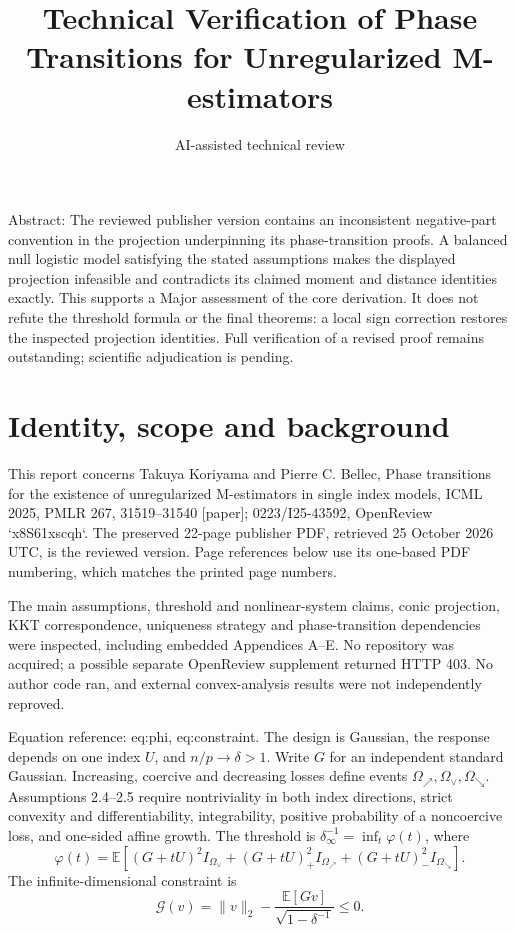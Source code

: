 \documentclass[10pt]{article}
\title{Technical Verification of Phase Transitions for Unregularized M-estimators}
\author{AI-assisted technical review}
\date{}
\begin{document}
\maketitle
Abstract: The reviewed publisher version contains an inconsistent negative-part convention in the projection underpinning its phase-transition proofs. A balanced null logistic model satisfying the stated assumptions makes the displayed projection infeasible and contradicts its claimed moment and distance identities exactly. This supports a Major assessment of the core derivation. It does not refute the threshold formula or the final theorems: a local sign correction restores the inspected projection identities. Full verification of a revised proof remains outstanding; scientific adjudication is pending.\par
\section*{Identity, scope and background}
This report concerns Takuya Koriyama and Pierre C. Bellec, Phase transitions for the existence of unregularized M-estimators in single index models, ICML 2025, PMLR 267, 31519–31540 [paper]; 0223/I25-43592, OpenReview `x8S61xscqh`. The preserved 22-page publisher PDF, retrieved 25 October 2026 UTC, is the reviewed version. Page references below use its one-based PDF numbering, which matches the printed page numbers.\par
The main assumptions, threshold and nonlinear-system claims, conic projection, KKT correspondence, uniqueness strategy and phase-transition dependencies were inspected, including embedded Appendices A–E. No repository was acquired; a possible separate OpenReview supplement returned HTTP 403. No author code ran, and external convex-analysis results were not independently reproved.\par
Equation reference: eq:phi, eq:constraint. The design is Gaussian, the response depends on one index \(U\), and \(n/p\to\delta>1\). Write \(G\) for an independent standard Gaussian. Increasing, coercive and decreasing losses define events \(\Omega_\nearrow,\Omega_\vee,\Omega_\searrow\). Assumptions 2.4–2.5 require nontriviality in both index directions, strict convexity and differentiability, integrability, positive probability of a noncoercive loss, and one-sided affine growth. The threshold is \(\delta_\infty^{-1}=\inf_t\varphi(t)\), where \[
\varphi(t)=\mathbb E\!\left[(G+tU)^2I_{\Omega_\vee}
 +(G+tU)_+^2I_{\Omega_\nearrow}
 +(G+tU)_-^2I_{\Omega_\searrow}\right].\] The infinite-dimensional constraint is \[
\mathcal G(v)=\|v\|_2-\frac{\mathbb E[Gv]}{\sqrt{1-\delta^{-1}}}\leq0.\]\par
\end{document}
